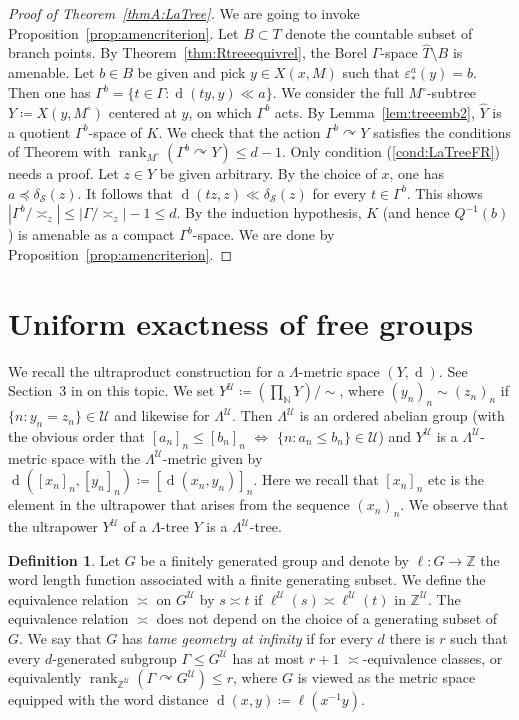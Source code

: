 \documentclass[12pt,nosumlimits,nonamelimits]{amsart}
\theoremstyle{remark}
\theoremstyle{definition}
\newtheorem{defn}[thm]{Definition}
\newcommand{\IN}{\mathbb{N}}
\newcommand{\IZ}{\mathbb{Z}}
\newcommand{\cS}{\mathcal{S}}
\newcommand{\cU}{\mathcal{U}}
\newcommand{\ve}{\varepsilon}
\newcommand{\Ga}{\Gamma}
\newcommand{\La}{\Lambda}
\newcommand{\acts}{\curvearrowright}
\DeclareMathOperator{\rank}{rank}
\DeclareMathOperator{\dist}{d}
\begin{document}
\begin{proof}[Proof of Theorem~\ref{thmA:LaTree}]
We are going to invoke Proposition~\ref{prop:amencriterion}. 
Let $B \subset T$ denote the countable 
subset of branch points. 
By Theorem~\ref{thm:Rtreeequivrel}, 
the Borel $\Ga$-space $\hat{T}\setminus B$ is amenable.
Let $b\in B$ be given and pick 
$y\in X(x,M)$ such that $\ve_*^a(y)=b$. 
Then one has 
$\Ga^b = \{ t\in\Ga : \dist(ty,y) \ll a \}$.
We consider the full $M^\circ$-subtree 
$Y \coloneq X(y,M^\circ)$ centered at $y$, 
on which $\Ga^b$ acts. 
By Lemma~\ref{lem:treeemb2}, $\hat{Y}$ is a quotient $\Ga^b$-space of $K$. 
We check that the action $\Ga^b\acts Y$ satisfies the conditions of Theorem 
with $\rank_{M^\circ}(\Ga^b\acts Y) \le d-1$. 
Only condition (\ref{cond:LaTreeFR}) needs a proof. 
Let $z\in Y$ be given arbitrary. 
By the choice of $x$, one has 
$a \preceq \delta_{\cS}(z)$. 
It follows that 
$\dist(tz,z) \ll \delta_{\cS}(z)$ for every $t\in\Ga^b$. 
This shows $|\Ga^b/{\asymp_z}| \le |\Ga/{\asymp_z}|-1\le d$. 
By the induction hypothesis, $K$ (and hence $Q^{-1}(b)$) 
is amenable as a compact $\Ga^b$-space. 
We are done by Proposition~\ref{prop:amencriterion}. 
\end{proof}
%
%
\section{Uniform exactness of free groups}\label{sec:tame}
%
%
We recall the ultraproduct construction 
for a $\La$-metric space $(Y,\dist)$. 
See Section~3 in \cite{guirardel} on this topic.
We set $Y^\cU \coloneq (\prod_{\IN} Y)/{\sim}$, where $(y_n)_n\sim(z_n)_n$ if 
$\{ n : y_n=z_n \}\in\cU$ and likewise for $\La^\cU$. 
Then $\La^\cU$ is an ordered abelian group 
(with the obvious order that 
$[a_n]_n\le[b_n]_n$ $\Leftrightarrow$ $\{ n : a_n\le b_n\}\in\cU$) 
and $Y^\cU$ is a $\La^\cU$-metric space with 
the $\La^\cU$-metric given by 
$\dist([x_n]_n,[y_n]_n) \coloneq [ \dist(x_n,y_n) ]_n$. 
Here we recall that $[x_n]_n$ etc is the element 
in the ultrapower that arises from the sequence $(x_n)_n$. 
We observe that the ultrapower $Y^\cU$ of a $\La$-tree $Y$ 
is a $\La^\cU$-tree. 
%
\begin{defn}
Let $G$ be a finitely generated group and denote by  
$\ell\colon G\to\IZ$ the word length function 
associated with a finite generating subset. 
We define the equivalence relation $\asymp$ 
on $G^\cU$ by $s\asymp t$ 
if $\ell^\cU(s) \asymp \ell^\cU(t)$ in $\IZ^\cU$. 
The equivalence relation $\asymp$ does not depend 
on the choice of a generating subset of $G$. 
We say that $G$ has \emph{tame geometry at infinity} 
if for every $d$ there is $r$ such that 
every $d$-generated subgroup $\Ga \le G^\cU$ 
has at most $r+1$ $\asymp$-equivalence classes, 
or equivalently $\rank_{\IZ^\cU}(\Ga\acts G^\cU)\le r$, 
where $G$ is viewed as the metric space 
equipped with the word distance 
$\dist(x,y) \coloneq \ell(x^{-1}y)$. 
\end{defn}
\end{document}
